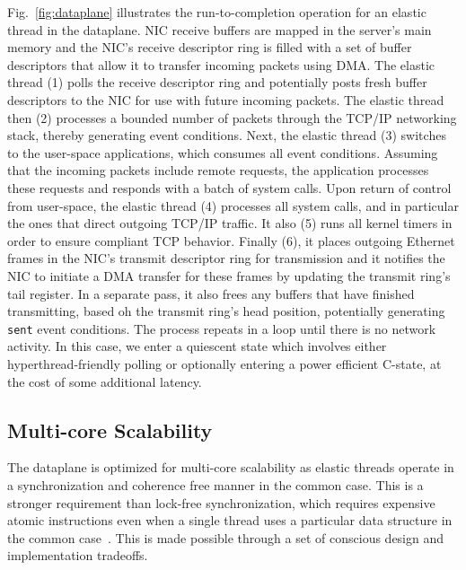 % 

Fig.~\ref{fig:dataplane} illustrates the run-to-completion operation
for an elastic thread in the \ix dataplane. NIC receive buffers are
mapped in the server's main memory and the NIC's receive descriptor
ring is filled with a set of buffer descriptors that allow it to
transfer incoming packets using DMA\@.  The elastic thread (1) polls
the receive descriptor ring and potentially posts fresh buffer
descriptors to the NIC for use with future incoming packets. The
elastic thread then (2) processes a bounded number of packets through
the TCP/IP networking stack, thereby generating event
conditions. Next, the elastic thread (3) switches to the user-space
applications, which consumes all event conditions. Assuming that the
incoming packets include remote requests, the application processes
these requests and responds with a batch of system calls. Upon return
of control from user-space, the elastic thread (4) processes all
system calls, and in particular the ones that direct outgoing TCP/IP
traffic. It also (5) runs all kernel timers in order to ensure
compliant TCP behavior. Finally (6), it places outgoing Ethernet
frames in the NIC's transmit descriptor ring for transmission and it
notifies the NIC to initiate a DMA transfer for these frames by
updating the transmit ring's tail register. In a separate pass, it
also frees any buffers that have finished transmitting, based oh the
transmit ring's head position, potentially generating \texttt{sent}
event conditions.  The process repeats in a loop until there is no
network activity. In this case, we enter a quiescent state which
involves either hyperthread-friendly polling or optionally entering a
power efficient C-state, at the cost of some additional latency.


\subsection{Multi-core Scalability}
\label{sec:impl:cohfree}

The \ix dataplane is optimized for multi-core scalability as elastic
threads operate in a synchronization and coherence free manner in the
common case. This is a stronger requirement than lock-free
synchronization, which requires expensive atomic instructions even
when a single thread uses a particular data structure in the common
case~\cite{DBLP:conf/sosp/DavidGT13}.  This is made possible through a
set of conscious design and implementation tradeoffs.

